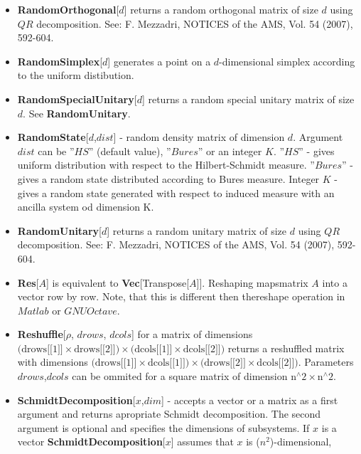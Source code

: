 \documentclass[a4paper,10pt]{scrartcl}
\begin{document}
\begin{itemize}
\item  \textbf{RandomOrthogonal}[$d$] returns a random orthogonal matrix of size $d$ using $QR$ decomposition. See: F. Mezzadri, NOTICES of the AMS, Vol. 54 (2007), 592-604.
\item  \textbf{RandomSimplex}[$d$] generates a point on a $d$-dimensional simplex according to the uniform distibution.
\item  \textbf{RandomSpecialUnitary}[$d$] returns a random special unitary matrix of size $d$. See \textbf{RandomUnitary}.
\item  \textbf{RandomState}[$d$,$dist$] - random density matrix of dimension $d$. Argument $dist$ can be ''$HS$'' (default value), ''$Bures$'' or an integer $K$. \newline{}
\indent{} ''$HS$'' - gives uniform distribution with respect to the Hilbert-Schmidt measure. \newline{}
\indent{} ''$Bures$'' - gives a random state distributed according to Bures measure. \newline{}
\indent{} Integer $K$ - gives a random state generated with respect to induced measure with an ancilla system od dimension K.
\item  \textbf{RandomUnitary}[$d$] returns a random unitary matrix of size $d$ using $QR$ decomposition. See: F. Mezzadri,  NOTICES of the AMS, Vol. 54 (2007), 592-604.
\item  \textbf{Res}[$A$] is equivalent to \textbf{Vec}[Transpose[$A$]]. Reshaping mapsmatrix $A$ into a vector row by row. Note, that this is different then thereshape operation in $Matlab$ or $GNU Octave$.
\item  \textbf{Reshuffle}[$\rho$, {$drows$, $dcols$}] for a matrix of dimensions $\text{(drows[[1]]$\times $drows[[2]])$\times $(dcols[[1]]$\times $dcols[[2]])}$ returns a reshuffled matrix with dimensions $\text{(drows[[1]]$\times $dcols[[1]])$\times $(drows[[2]]$\times $dcols[[2]])}$.\newline{}
Parameters {$drows$,$dcols$} can be ommited for a square matrix of dimension $\text{n${}^{\wedge}$2$\times $n${}^{\wedge}$2}$.
\item  \textbf{SchmidtDecomposition}[$x$,$dim$] - accepts a vector or a matrix as a first argument and returns apropriate Schmidt decomposition. The second argument is optional and specifies the dimensions of subsystems.\newline{}
If $x$ is a vector\newline{}
\indent{} \textbf{SchmidtDecomposition}[$x$] assumes that $x$ is ($n^2$)-dimensional,\newline{}

\end{itemize}
\end{document}
